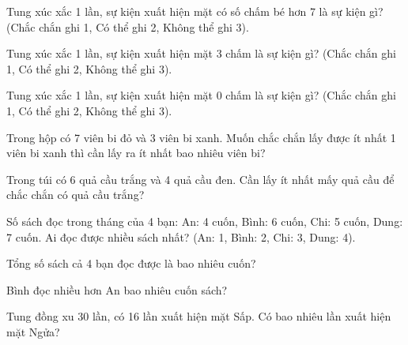 \begin{ex}
Tung xúc xắc 1 lần, sự kiện xuất hiện mặt có số chấm bé hơn 7 là sự kiện gì? (Chắc chắn ghi 1, Có thể ghi 2, Không thể ghi 3).
\end{ex}

\begin{ex}
Tung xúc xắc 1 lần, sự kiện xuất hiện mặt 3 chấm là sự kiện gì? (Chắc chắn ghi 1, Có thể ghi 2, Không thể ghi 3).
\end{ex}

\begin{ex}
Tung xúc xắc 1 lần, sự kiện xuất hiện mặt 0 chấm là sự kiện gì? (Chắc chắn ghi 1, Có thể ghi 2, Không thể ghi 3).
\end{ex}

\begin{ex}
Trong hộp có 7 viên bi đỏ và 3 viên bi xanh. Muốn chắc chắn lấy được ít nhất 1 viên bi xanh thì cần lấy ra ít nhất bao nhiêu viên bi?
\end{ex}

\begin{ex}
Trong túi có 6 quả cầu trắng và 4 quả cầu đen. Cần lấy ít nhất mấy quả cầu để chắc chắn có quả cầu trắng?
\end{ex}

\begin{ex}
Số sách đọc trong tháng của 4 bạn: An: 4 cuốn, Bình: 6 cuốn, Chi: 5 cuốn, Dung: 7 cuốn. Ai đọc được nhiều sách nhất? (An: 1, Bình: 2, Chi: 3, Dung: 4).
\end{ex}

\begin{ex}
Tổng số sách cả 4 bạn đọc được là bao nhiêu cuốn?
\end{ex}

\begin{ex}
Bình đọc nhiều hơn An bao nhiêu cuốn sách?
\end{ex}

\begin{ex}
Tung đồng xu 30 lần, có 16 lần xuất hiện mặt Sấp. Có bao nhiêu lần xuất hiện mặt Ngửa?
\end{ex}

